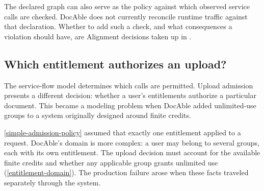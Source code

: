 
The declared graph can also serve as the policy against which observed service calls are checked. DocAble does not currently reconcile runtime traffic against that declaration. Whether to add such a check, and what consequences a violation should have, are Alignment decisions taken up in .

\subsection{Which entitlement authorizes an upload?}\label{heading:which-entitlement-authorizes-an-upload}


The service-flow model determines which calls are permitted. Upload admission presents a different decision: whether a user's entitlements authorize a particular document. This became a modeling problem when DocAble added unlimited-use groups to a system originally designed around finite credits.


\autoref{simple-admission-policy} assumed that exactly one entitlement applied to a request. DocAble's domain is more complex: a user may belong to several groups, each with its own entitlement. The upload decision must account for the available finite credits and whether any applicable group grants unlimited use (\autoref{entitlement-domain}). The production failure arose when these facts traveled separately through the system.

